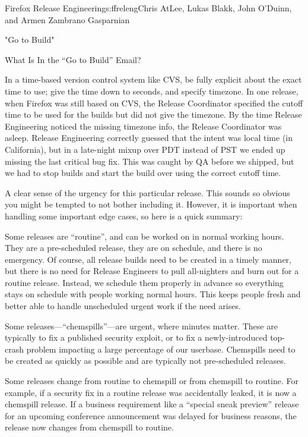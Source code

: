 \begin{aosachapter}{Firefox Release Engineering}{s:ffreleng}{Chris AtLee, Lukas Blakk, John O'Duinn, and Armen Zambrano Gasparnian}
\begin{aosasect1}{"Go to Build"}
\begin{aosasect2}{What Is In the ``Go to Build'' Email?}
\begin{aosaenumerate}
\begin{aosaenumerate2}
    \item In a time-based version control system like CVS, be fully
      explicit about the exact time to use; give the time down to seconds,
      and specify timezone. In one release, when Firefox was still
      based on CVS, the Release Coordinator specified the cutoff time
      to be used for the builds but did not give the timezone. By the
      time Release Engineering noticed the missing timezone info, the
      Release Coordinator was asleep. Release
      Engineering correctly guessed that the intent was local time (in
      California), but in a late-night mixup over PDT instead of PST
      we ended up missing the last critical bug fix. This was caught
      by QA before we shipped, but we had to stop builds and
      start the build over using the correct cutoff time.

    \end{aosaenumerate2}

\item A clear sense of the urgency for this particular release.  This
  sounds so obvious you might be tempted to not bother including
  it. However, it is important when handling some important edge
  cases, so here is a quick summary:

  \begin{aosaenumerate2}

    \item Some releases are ``routine'', and can be worked on in
      normal working hours. They are a pre-scheduled release, they are
      on schedule, and there is no emergency. Of course, all release
      builds need to be created in a timely manner, but there is no
      need for Release Engineers to pull all-nighters and burn out
      for a routine release.  Instead, we schedule them
      properly in advance so everything stays on schedule with people
      working normal hours. This keeps people fresh and better able to
      handle unscheduled urgent work if the need arises.

    \item Some releases---``chemspills''---are urgent, where minutes matter. These are
      typically to fix a published security exploit, or to fix a
      newly-introduced top-crash problem impacting a large percentage
      of our userbase. Chemspills need to be created as
      quickly as possible and are typically not pre-scheduled
      releases.

    \item Some releases change from routine to chemspill or
      from chemspill to routine. For example, if a security
      fix in a routine release was accidentally leaked, it is now
      a chemspill release. If a business requirement like a
      ``special sneak preview'' release for an upcoming
      conference announcement was delayed for business
      reasons, the release now changes from chemspill to
      routine.


\end{aosaenumerate2}
\end{aosaenumerate}
\end{aosasect2}
\end{aosasect1}
\end{aosachapter}
